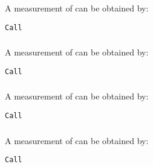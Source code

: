 A measurement of  can be obtained by:

\begin{lstlisting}[style=fortran]
Call 
\end{lstlisting}

\subsubsection{}

A measurement of  can be obtained by:

\begin{lstlisting}[style=fortran]
Call 
\end{lstlisting}

\subsubsection{}

A measurement of  can be obtained by:

\begin{lstlisting}[style=fortran]
Call 
\end{lstlisting}

\subsubsection{}

A measurement of  can be obtained by:

\begin{lstlisting}[style=fortran]
Call 
\end{lstlisting}
